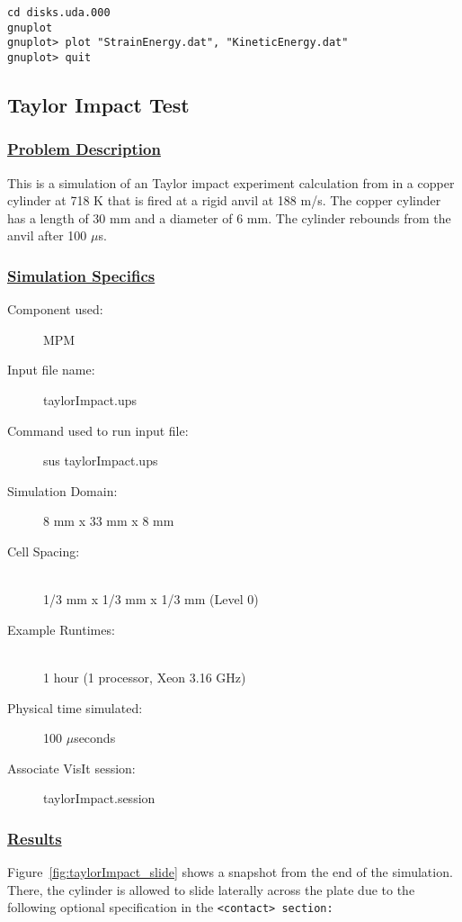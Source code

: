 \begin{Verbatim}[fontsize=\footnotesize]
cd disks.uda.000
gnuplot
gnuplot> plot "StrainEnergy.dat", "KineticEnergy.dat"
gnuplot> quit
\end{Verbatim}
%
\subsection*{\center Taylor Impact Test}
\subsubsection*{\underline{Problem Description}}
This is a simulation of an Taylor impact experiment calculation from 
\cite{Gust82} in a copper cylinder at 718 K that is fired at a
rigid anvil at 188 m/s.  The copper cylinder has a length of 30 mm and
a diameter of 6 mm.  The cylinder rebounds from the anvil after 100 $\mu$s.
 
\subsubsection*{\underline{Simulation Specifics}}
\begin{description} 
\item [Component used:] \hfill MPM
\item [Input file name:] \hfill taylorImpact.ups
\item [Command used to run input file:]\hfill sus taylorImpact.ups
\item [Simulation Domain:]\hfill 8 mm x 33 mm x 8 mm

\item [Cell Spacing:]\hfill \\ 
  1/3 mm x 1/3 mm x 1/3 mm (Level 0)

\item [Example Runtimes:] \hfill \\
  1 hour   (1 processor, Xeon 3.16 GHz)\\

\item [Physical time simulated:] \hfill 100 $\mu$seconds

\item [Associate VisIt session:] \hfill taylorImpact.session

\end{description}

\subsubsection*{\underline{Results}}
Figure~\ref{fig:taylorImpact_slide} shows a snapshot from the end of the simulation.
There, the cylinder is allowed to slide laterally across the plate due
to the following optional specification in the \tt <contact> \normalfont
section:


